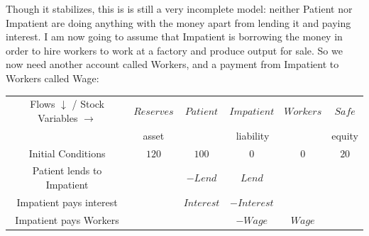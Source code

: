 \begin{center}
\end{center}

Though it stabilizes, this is is still a very incomplete model:
neither Patient nor Impatient are doing anything with the money apart
from lending it and paying interest. I am now going to assume that
Impatient is borrowing the money in order to hire workers to work at a
factory and produce output for sale. So we now need another account
called Workers, and a payment from Impatient to Workers called Wage:

{
  \noindent
\small
\begin{tabular}{|c|ccccc|}
\hline
Flows $\downarrow$ / Stock Variables $\rightarrow$&\multicolumn{1}{|c|}{$Reserves$}&\multicolumn{1}{|c|}{$Patient$}&\multicolumn{1}{|c|}{$Impatient$}&\multicolumn{1}{|c|}{$Workers$}&\multicolumn{1}{|c|}{$Safe$}\\\cline{2-6}&\multicolumn{1}{|c|}{asset}&\multicolumn{3}{|c|}{liability}&\multicolumn{1}{|c|}{equity}\\\hline
Initial Conditions&$120$&$100$&$0$&$0$&$20$\\
Patient lends to Impatient&&$-Lend$&$Lend$&&\\
Impatient pays interest&&$Interest$&$-Interest$&&\\
Impatient pays Workers&&&$-Wage$&$Wage$&\\
\hline
\end{tabular}
}

